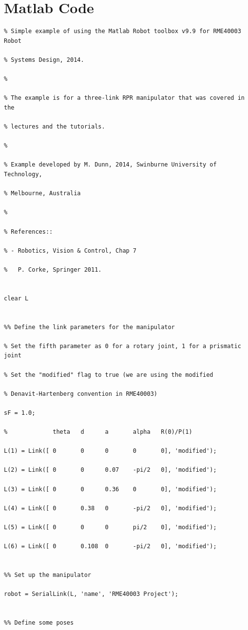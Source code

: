 \documentclass[11pt,a4paper]{report}
\begin{document}
\appendix
\chapter{Matlab Code}
\label{Matlab}
\lstset{numbers = left}

\begin{lstlisting}
% Simple example of using the Matlab Robot toolbox v9.9 for RME40003 Robot 

% Systems Design, 2014.

%

% The example is for a three-link RPR manipulator that was covered in the 

% lectures and the tutorials.

%

% Example developed by M. Dunn, 2014, Swinburne University of Technology,

% Melbourne, Australia

%

% References::

% - Robotics, Vision & Control, Chap 7

%   P. Corke, Springer 2011.


clear L


%% Define the link parameters for the manipulator

% Set the fifth parameter as 0 for a rotary joint, 1 for a prismatic joint

% Set the "modified" flag to true (we are using the modified

% Denavit-Hartenberg convention in RME40003)

sF = 1.0;

%             theta   d      a       alpha   R(0)/P(1)

L(1) = Link([ 0       0      0       0       0], 'modified');

L(2) = Link([ 0       0      0.07    -pi/2   0], 'modified');

L(3) = Link([ 0       0      0.36    0       0], 'modified');

L(4) = Link([ 0       0.38   0       -pi/2   0], 'modified');

L(5) = Link([ 0       0      0       pi/2    0], 'modified');

L(6) = Link([ 0       0.108  0       -pi/2   0], 'modified');


%% Set up the manipulator

robot = SerialLink(L, 'name', 'RME40003 Project');


%% Define some poses



\end{lstlisting}
\end{document}
